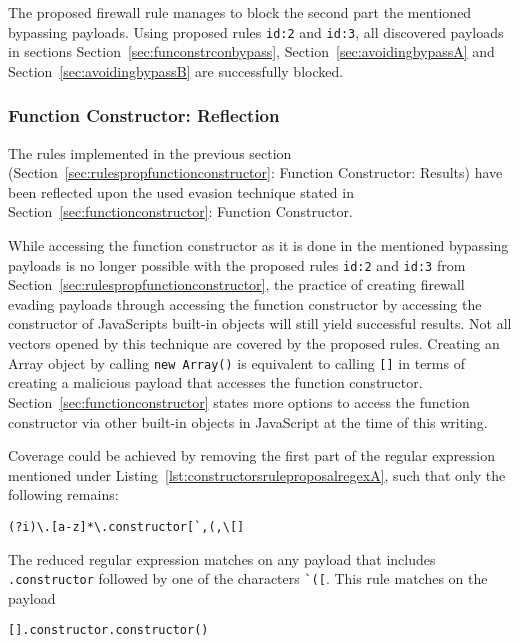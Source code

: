 The proposed firewall rule manages to block the second part the mentioned bypassing payloads. Using proposed rules \verb|id:2| and \verb|id:3|, all discovered payloads in sections Section~\ref{sec:funconstrconbypass}, Section~\ref{sec:avoidingbypassA} and Section~\ref{sec:avoidingbypassB} are successfully blocked.



\subsubsection{Function Constructor: Reflection}
The rules implemented in the previous section (Section~\ref{sec:rulespropfunctionconstructor}: Function Constructor: Results) have been reflected upon the used evasion technique stated in Section~\ref{sec:functionconstructor}: Function Constructor.

While accessing the function constructor as it is done in the mentioned bypassing payloads is no longer possible with the proposed rules \verb|id:2| and \verb|id:3| from Section~\ref{sec:rulespropfunctionconstructor}, the practice of creating firewall evading payloads through accessing the function constructor by accessing the constructor of JavaScripts built-in objects will still yield successful results. Not all vectors opened by this technique are covered by the proposed rules. Creating an Array object by calling \verb|new Array()| is equivalent to calling \verb|[]| in terms of creating a malicious payload that accesses the function constructor. Section~\ref{sec:functionconstructor} states more options to access the function constructor via other built-in objects in JavaScript at the time of this writing.

Coverage could be achieved by removing the first part of the regular expression mentioned under Listing~\ref{lst:constructorsruleproposalregexA}, such that only the following remains:

\begin{lstlisting}[style=basicStyle, caption=reduced regex of proposed rule id:2, label={lst:constructorsruleproposalregexB}]
(?i)\.[a-z]*\.constructor[`,(,\[]
\end{lstlisting}

The reduced regular expression matches on any payload that includes \verb|.constructor| followed by one of the characters \verb|`([|. This rule matches on the payload

\begin{lstlisting}[style=basicStyle]
[].constructor.constructor()
\end{lstlisting}

